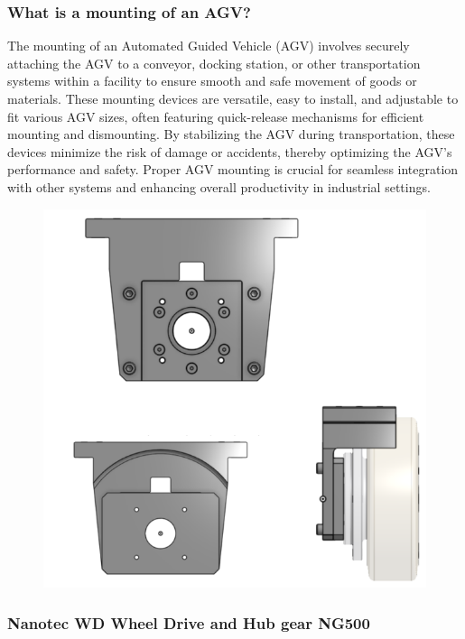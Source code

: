 \documentclass[../../main]{subfiles}
\begin{document}
  \subsubsection{What is a mounting of an AGV?}
  The mounting of an Automated Guided Vehicle (AGV) involves securely attaching the AGV to a conveyor, docking station, or other transportation systems within a facility to ensure smooth and safe movement of goods or materials. These mounting devices are versatile, easy to install, and adjustable to fit various AGV sizes, often featuring quick-release mechanisms for efficient mounting and dismounting. By stabilizing the AGV during transportation, these devices minimize the risk of damage or accidents, thereby optimizing the AGV's performance and safety. Proper AGV mounting is crucial for seamless integration with other systems and enhancing overall productivity in industrial settings.
\begin{figure}[h!]
\centering
\includegraphics[width=\textwidth]{img/wheel3d.png}
\caption{}
\end{figure}

\subsubsection{Nanotec WD Wheel Drive and Hub gear NG500}
\end{document}
